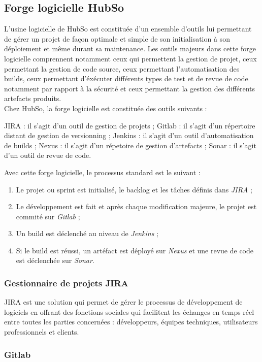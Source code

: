 \subsection{Forge logicielle HubSo}
L'usine logicielle de HubSo est constituée d'un ensemble d'outils lui permettant de gérer un projet de façon optimale et simple de son initialisation à son déploiement et même durant sa maintenance. Les outils majeurs
dans cette forge logicielle comprennent notamment ceux qui permettent la gestion de projet, ceux permettant la gestion de code source, ceux permettant l'automatisation des builds, ceux permettant d'éxécuter différents types de test et de revue de code notamment par rapport à la sécurité et ceux permettant la gestion des différents artefacts produits.\\
Chez HubSo, la forge logicielle est constituée des outils suivants :
\begin{itemize}
	\itemcheck JIRA : il s'agit d'un outil de gestion de projets ;
	\itemcheck Gitlab : il s'agit d'un répertoire distant de gestion de versionning ;
	\itemcheck Jenkins : il s'agit d'un outil d'automatisation de builds ;
	\itemcheck Nexus : il s'agit d'un répetoire de gestion d'artefacts ;
	\itemcheck Sonar : il s'agit d'un outil de revue de code. 
\end{itemize}
Avec cette forge logicielle, le processus standard est le suivant :
\begin{enumerate}
	\item Le projet ou sprint est initialisé, le backlog et les tâches définis dans \textit{JIRA} ;
	\item Le développement est fait et après chaque modification majeure, le projet est commité sur \textit{Gitlab} ;
	\item Un build est déclenché au niveau de \textit{Jenkins} ;
	\item Si le build est réussi, un artéfact est déployé sur \textit{Nexus} et une revue de code est déclenchée sur \textit{Sonar}.
\end{enumerate}
\subsubsection{Gestionnaire de projets JIRA}
JIRA est une solution qui permet de gérer le processus de développement de logiciels en offrant des fonctions sociales qui facilitent les échanges en temps réel entre toutes les parties concernées : développeurs, équipes techniques, utilisateurs professionnels et clients.
\subsubsection{Gitlab}
